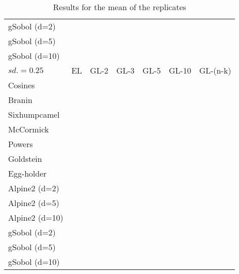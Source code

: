 \documentclass[twoside]{article}
\begin{document}
\begin{table*}[t!]
\begin{center}
\begin{tabular}{lrrrrrr}
       gSobol (d=2) &&&&&\\
       gSobol (d=5) &&&&&\\
       gSobol (d=10) &&&&&\\
\bottomrule
\toprule
     $sd.=0.25 $ &        EL &      GL-2 &      GL-3 &      GL-5 &     GL-10 & GL-(n-k) \\
\midrule
      Cosines & &&&&&\\
       Branin & &&&&&\\
 Sixhumpcamel & &&&&&\\
    McCormick & &&&&&\\
           Powers & &&&&&\\
                  Goldstein &&&&&\\
       Egg-holder &&&&&\\   
       Alpine2 (d=2) &&&&&\\
       Alpine2 (d=5) &&&&&\\
       Alpine2 (d=10) &&&&&\\
        gSobol (d=2) &&&&&\\
       gSobol (d=5) &&&&&\\
       gSobol (d=10) &&&&&\\
\bottomrule
\end{tabular}\caption{Results for the mean of the replicates}
\end{center}
\end{table*}

\end{document}
